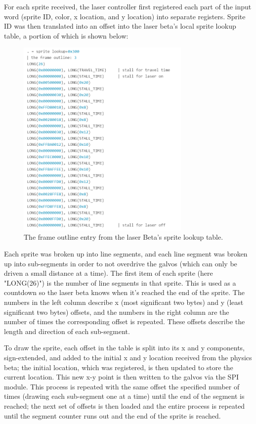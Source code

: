 \documentclass{article}
\begin{document}
	For each sprite received, the laser controller first registered each part of the input word (sprite ID, color, x location, and y location) into separate registers. Sprite ID was then translated into an offset into the laser beta's local sprite lookup table, a portion of which is shown below:

\begin{figure}[H]
\begin{center}
\includegraphics[width=0.75\textwidth]{sprite_lookup_laser}
\caption{The frame outline entry from the laser Beta's sprite lookup table.}
\end{center}
\end{figure}

Each sprite was broken up into line segments, and each line segment was broken up into sub-segments in order to not overdrive the galvos (which can only be driven a small distance at a time). The first item of each sprite (here "LONG(26)") is the number of line segments in that sprite. This is used as a countdown so the laser beta knows when it's reached the end of the sprite. The numbers in the left column describe x (most significant two bytes) and y (least significant two bytes) offsets, and the numbers in the right column are the number of times the corresponding offset is repeated. These offsets describe the length and direction of each sub-segment.

 To draw the sprite, each offset in the table is split into its x and y components, sign-extended, and added to the initial x and y location received from the physics beta; the initial location, which was registered, is then updated to store the current location. This new x-y point is then written to the galvos via the SPI module. This process is repeated with the same offset the specified number of times (drawing each sub-segment one at a time) until the end of the segment is reached; the next set of offsets is then loaded and the entire process is repeated until the segment counter runs out and the end of the sprite is reached.
 
\end{document}
